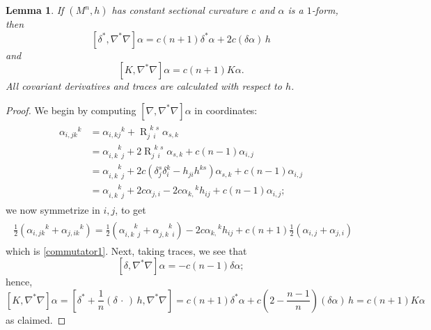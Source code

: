 \documentclass[10pt,reqno]{amsart}
\newtheorem{lemma}[theorem]{Lemma}
\DeclareMathOperator{\R}{R}
\newcommand{\riem}{\R}
\newcommand{\riemdudu}[4]{\riem^{\phantom{#1} #2 \phantom{#3} #4}_{#1 \phantom{#2} #3}}
\begin{document}
\begin{lemma} \label{lemma:commute-delta-delstar} \label{lemma:commute-delta-div}
If $(M^n,h)$ has constant sectional curvature $c$ and $\alpha$ is a  $1$-form, then
\begin{equation}\label{commutator1}
[ \delta^*, \nabla^* \nabla] \alpha = c(n+1) \delta^* \alpha + 2c (\delta \alpha)\,  h
\end{equation}
and
\begin{equation}\label{commutator2}
[K, \nabla^* \nabla] \alpha = c(n+1)  K\alpha. 
\end{equation}
All covariant derivatives and traces are calculated with respect to $h$.
\end{lemma}
\begin{proof} 
We begin by computing $[\nabla, \nabla^* \nabla] \alpha$ in coordinates:
\begin{align*}
\begin{aligned}
{\alpha_{i,jk}}^k  &= {\alpha_{i,kj}}^k + \riemdudu{j}{k}{i}{s} \alpha_{s,k} \\
&= \alpha_{i,k\phantom{k}j}^{\phantom{i,k}k}  + 2 \riemdudu{j}{k}{i}{s} \alpha_{s,k} + c(n-1) \alpha_{i,j} \\
&= \alpha_{i,k\phantom{k}j}^{\phantom{i,k}k}  + 2 c ( \delta_j^s \delta_i^k - h_{ji} h^{ks} ) \alpha_{s,k} + c(n-1) \alpha_{i,j} \\
&= \alpha_{i,k\phantom{k}j}^{\phantom{i,k}k}  + 2 c  \alpha_{j,i} - 2c {\alpha_{k,}}^k h_{ij} + c(n-1) \alpha_{i,j} ;
\end{aligned}
\end{align*}
we now symmetrize in $i, j$, to get
\begin{align*}
\begin{aligned}
\frac{1}{2} ( {\alpha_{i,jk}}^k + {\alpha_{j,ik}}^k ) 
= \frac{1}{2} ( \alpha_{i,k\phantom{k}j}^{\phantom{i,k}k} + \alpha_{j,k\phantom{k}i}^{\phantom{j,k}k})   - 2c {\alpha_{k,}}^k h_{ij} + 
c(n+1) \frac12 (\alpha_{i,j}  + \alpha_{j,i} )
\end{aligned}
\end{align*}
which is \eqref{commutator1}. Next, taking traces, we see that
\[
[ \delta, \nabla^* \nabla]\alpha = -c (n-1) \delta \alpha;
\]
hence,
\[
[K, \nabla^* \nabla]\alpha = [ \delta^* + \frac{1}{n}(\delta \, \cdot \, ) \, h, \nabla^* \nabla] = c(n+1) \delta^* \alpha + 
c (2 - \frac{n-1}{n}) (\delta \alpha)\, h = c(n+1) K\alpha
\]
as claimed.
\end{proof}
\end{document}
